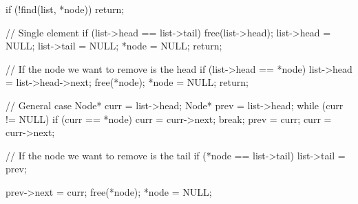 \documentclass{report}
\begin{document}
\begin{itemize}
\begin{cppcode}
{                    if (!find(list, *node)) return; 

                    // Single element
                    if (list->head == list->tail) {
                        free(list->head);
                        list->head = NULL;
                        list->tail = NULL;
                        *node = NULL;
                        return;
                    }

                    // If the node we want to remove is the head
                    if (list->head == *node) {
                        list->head = list->head->next; 
                        free(*node);
                        *node = NULL;
                        return;
                    }

                    // General case
                    Node* curr = list->head;
                    Node* prev = list->head;
                    while (curr != NULL) {
                        if (curr == *node) {
                            curr = curr->next;
                            break;
                        }
                        prev = curr;
                        curr = curr->next;
                    }

                    // If the node we want to remove is the tail
                    if (*node == list->tail) {
                        list->tail = prev;
                    }

                    prev->next = curr;
                    free(*node);
                    *node = NULL;
                }
            \end{cppcode}


    \end{itemize}
\end{document}
